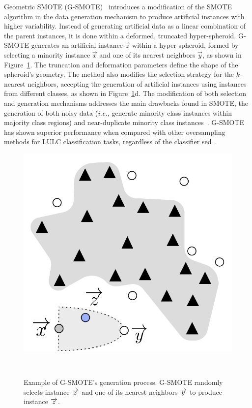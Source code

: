 \documentclass[remotesensing,article,submit,moreauthors,pdftex]{Definitions/mdpi}
\begin{document}
Geometric SMOTE (G-SMOTE)~\cite{Douzas2019} introduces a modification of the
SMOTE algorithm in the data generation mechanism to produce artificial
instances with higher variability. Instead of generating artificial data as a
linear combination of the parent instances, it is done within a deformed,
truncated hyper-spheroid. G-SMOTE generates an artificial instance
$\overrightarrow{z}$ within a hyper-spheroid, formed by selecting a minority
instance $\overrightarrow{x}$ and one of its nearest neighbors
$\overrightarrow{y}$, as shown in Figure~\ref{fig:data_generation}. The
truncation and deformation parameters define the shape of the spheroid's
geometry. The method also modifies the selection strategy for the $k$-nearest
neighbors, accepting the generation of artificial instances using instances
from different classes, as shown in Figure~\ref{fig:data_generation}d. The
modification of both selection and generation mechanisms addresses the main
drawbacks found in SMOTE, the generation of both noisy data (\textit{i.e.,}
generate minority class instances within majority class regions) and
near-duplicate minority class instances~\cite{Douzas2019}. G-SMOTE has shown
superior performance when compared with other oversampling methods for LULC
classification tasks, regardless of the classifier sed~\cite{Douzas2019class}.

\begin{figure}[htb]
	\centering
	\includegraphics[width=.6\linewidth]{../analysis/data_generation}
    \caption{Example of G-SMOTE's generation process. G-SMOTE randomly selects
        instance $\protect\overrightarrow{x}$ and one of its nearest neighbors
        $\protect\overrightarrow{y}$ to produce instance
        $\protect\overrightarrow{z}$.
    }~\label{fig:data_generation}
\end{figure}
\end{document}
